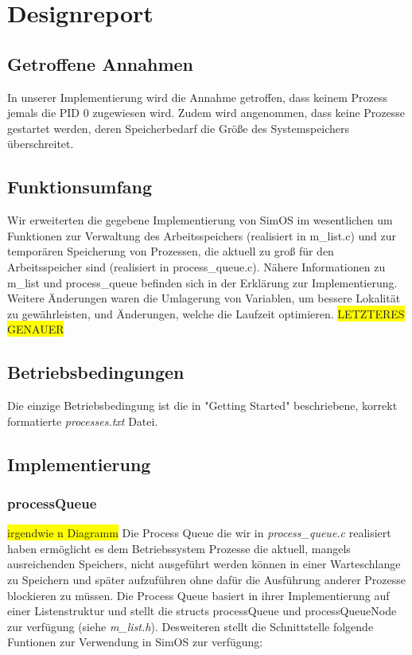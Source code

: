 \section{Designreport}
\subsection{Getroffene Annahmen}
In unserer Implementierung wird die Annahme getroffen, dass keinem Prozess jemals die PID 0 zugewiesen wird. Zudem wird angenommen, dass keine Prozesse gestartet werden, deren Speicherbedarf die Größe des Systemspeichers überschreitet.

\subsection{Funktionsumfang}
Wir erweiterten die gegebene Implementierung von SimOS im wesentlichen um Funktionen zur Verwaltung des Arbeitsspeichers (realisiert in m\_list.c) und zur temporären Speicherung von Prozessen, die aktuell zu groß für den Arbeitsspeicher sind (realisiert in process\_queue.c).
Nähere Informationen zu m\_list und process\_queue befinden sich in der Erklärung zur Implementierung.
Weitere Änderungen waren die Umlagerung von Variablen, um bessere Lokalität zu gewährleisten, und Änderungen, welche die Laufzeit optimieren.
\colorbox{yellow}{LETZTERES GENAUER}

\subsection{Betriebsbedingungen}
Die einzige Betriebsbedingung ist die in "Getting Started" beschriebene, korrekt formatierte \textit{processes.txt} Datei.


\subsection{Implementierung}

\subsubsection{processQueue}
\colorbox{yellow}{irgendwie n Diagramm}
Die Process Queue die wir in \textit{process\_queue.c} realisiert haben ermöglicht es dem Betriebssystem Prozesse die aktuell, mangels ausreichenden Speichers, nicht ausgeführt werden können in einer Warteschlange zu Speichern und später aufzuführen ohne dafür die Ausführung anderer Prozesse blockieren zu müssen.
Die Process Queue basiert in ihrer Implementierung auf einer Listenstruktur und stellt die structs processQueue und processQueueNode zur verfügung (siehe \textit{m\_list.h}).
Desweiteren stellt die Schnittstelle folgende Funtionen zur Verwendung in SimOS zur verfügung:

